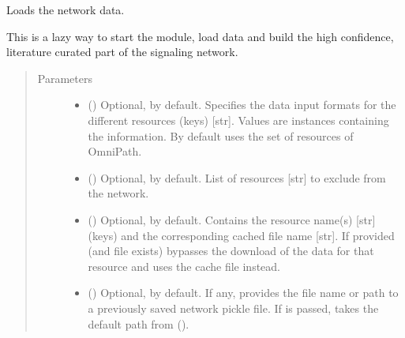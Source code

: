 \documentclass[letterpaper,10pt,english]{sphinxmanual}
\begin{document}
\begin{fulllineitems}

\begin{fulllineitems}
\label{\detokenize{main:pypath.main.PyPath.init_network}}
Loads the network data.

This is a lazy way to start the module, load data and build the
high confidence, literature curated part of the signaling
network.
\begin{quote}\begin{description}
\item[{Parameters}] \leavevmode\begin{itemize}
\item {} 
 () \textendash{} Optional,  by default. Specifies the data input
formats for the different resources (keys) {[}str{]}. Values
are  instances
containing the information. By default uses the set of
resources of OmniPath.

\item {} 
 () \textendash{} Optional, \sphinxcode{\sphinxupquote{{[}{]}}} by default. List of resources {[}str{]} to
exclude from the network.

\item {} 
 () \textendash{} Optional, \sphinxcode{\sphinxupquote{\{\}}} by default. Contains the resource name(s)
{[}str{]} (keys) and the corresponding cached file name {[}str{]}.
If provided (and file exists) bypasses the download of the
data for that resource and uses the cache file instead.

\item {} 
 () \textendash{} Optional,  by default. If any, provides the file
name or path to a previously saved network pickle file.
If  is passed, takes the default path from
{\hyperref[\detokenize{main:pypath.main.PyPath.save_network}]{}}
().


\end{itemize}
\end{description}
\end{quote}
\end{fulllineitems}
\end{fulllineitems}
\end{document}
